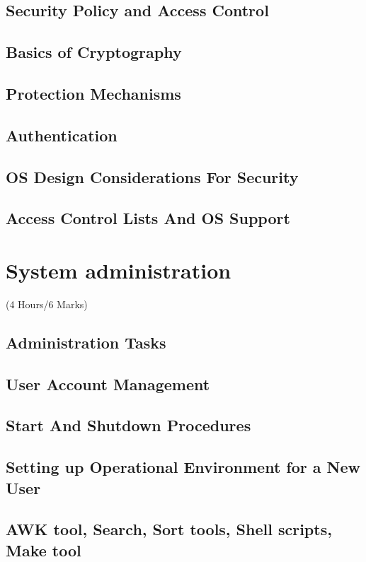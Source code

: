 \documentclass[12pt]{article}
\begin{document}
\subsection{Security Policy and Access Control}
\subsection{Basics of Cryptography}
\subsection{Protection Mechanisms}
\subsection{Authentication}
\subsection{OS Design Considerations For Security}
\subsection{Access Control Lists And OS Support}

\pagebreak
\section{System administration}
\begin{center}(4 Hours/6 Marks)\end{center}
\subsection{Administration Tasks}
\subsection{User Account Management}
\subsection{Start And Shutdown Procedures}
\subsection{Setting up Operational Environment for a New User}
\subsection{AWK tool, Search, Sort tools, Shell scripts, Make tool}
\end{document}
